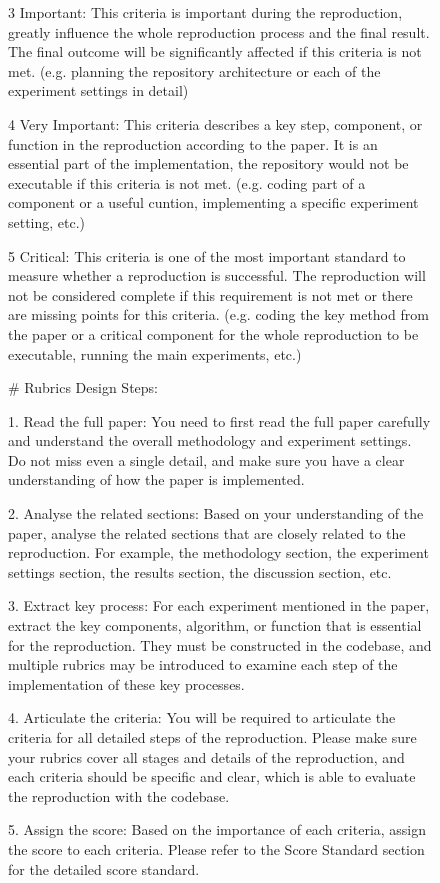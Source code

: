 \documentclass[11pt]{article}
\begin{document}
\begin{figure}[h]
\begin{tcolorbox}[]
3 Important: This criteria is important during the reproduction, greatly influence the whole reproduction process and the final result. The final outcome will be significantly affected if this criteria is not met. (e.g. planning the repository architecture or each of the experiment settings in detail)

4 Very Important: This criteria describes a key step, component, or function in the reproduction according to the paper. It is an essential part of the implementation, the repository would not be executable if this criteria is not met. (e.g. coding part of a component or a useful cuntion, implementing a specific experiment setting, etc.)

5 Critical: This criteria is one of the most important standard to measure whether a reproduction is successful. The reproduction will not be considered complete if this requirement is not met or there are missing points for this criteria. (e.g. coding the key method from the paper or a critical component for the whole reproduction to be executable, running the main experiments, etc.)

\# Rubrics Design Steps:

1. Read the full paper: You need to first read the full paper carefully and understand the overall methodology and experiment settings. Do not miss even a single detail, and make sure you have a clear understanding of how the paper is implemented.

2. Analyse the related sections: Based on your understanding of the paper, analyse the related sections that are closely related to the reproduction. For example, the methodology section, the experiment settings section, the results section, the discussion section, etc.

3. Extract key process: For each experiment mentioned in the paper, extract the key components, algorithm, or function that is essential for the reproduction. They must be constructed in the codebase, and multiple rubrics may be introduced to examine each step of the implementation of these key processes.

4. Articulate the criteria: You will be required to articulate the criteria for all detailed steps of the reproduction. Please make sure your rubrics cover all stages and details of the reproduction, and each criteria should be specific and clear, which is able to evaluate the reproduction with the codebase.

5. Assign the score: Based on the importance of each criteria, assign the score to each criteria. Please refer to the Score Standard section for the detailed score standard.


\end{tcolorbox}
\end{figure}
\end{document}
